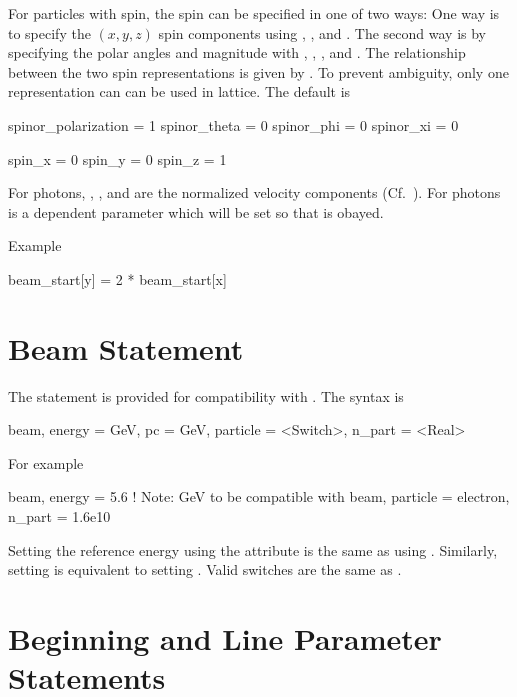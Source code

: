 For particles with spin, the spin can be specified in one of two ways:
One way is to specify the $(x, y, z)$ spin components using
, , and . The second way is by
specifying the polar angles and magnitude with ,
, , and . The
relationship between the two spin representations is given by
. To prevent ambiguity, only one representation can can be
used in lattice. The default is
\begin{example}
  spinor_polarization = 1
  spinor_theta        = 0
  spinor_phi          = 0
  spinor_xi           = 0

  spin_x              = 0
  spin_y              = 0
  spin_z              = 1
\end{example}

For photons, , , and  are the normalized velocity components
(Cf.~). For photons  is a dependent parameter which will be set
so that  is obayed.


Example
\begin{example}
  beam_start[y] = 2 * beam_start[x]
\end{example}

\section{Beam Statement}

The  statement is provided for compatibility with \mad. The syntax is
\begin{example}
  beam, energy = GeV, pc = GeV, particle = <Switch>, n_part = <Real>
\end{example}
For example
\begin{example}
  beam, energy = 5.6  ! Note: GeV to be compatible with \mad
  beam, particle = electron, n_part = 1.6e10
\end{example}
Setting the reference energy using the  attribute is the
same as using . Similarly, setting  is
equivalent to setting . Valid  switches
are the same as .

\section{Beginning and Line Parameter Statements}
\label{s:beginning}

